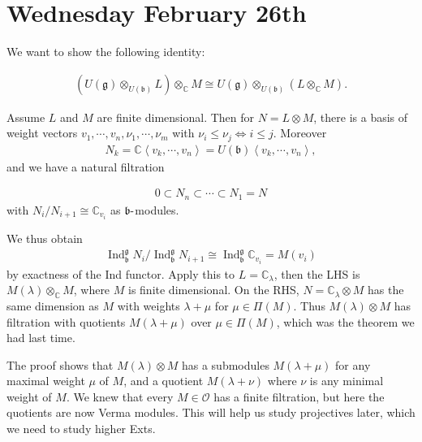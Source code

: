 \documentclass[11pt]{scrartcl}
\theoremstyle{definition}
\theoremstyle{theorem}
\theoremstyle{proof}
\theoremstyle{definition}
\theoremstyle{break}
\theoremstyle{problem}
\providecommand{\tightlist}{%
  \setlength{\itemsep}{0pt}\setlength{\parskip}{0pt}}
\DeclarePairedDelimiter\qty{(}{)}
\renewcommand{\qty}[1]{{\left(  {#1} \right)}}
\def\ind{\operatorname{Ind}}
\newcommand{\CC}[0]{{\mathbb{C}}}
\newcommand{\dash}[0]{{\hbox{-}}}
\newcommand{\generators}[1]{\left\langle{#1}\right\rangle}
\newcommand{\lieb}[0]{{\mathfrak{b}}}
\newcommand{\lieg}[0]{{\mathfrak{g}}}
\newcommand{\OO}[0]{{\mathcal{O}}}
\newcommand{\tensor}[0]{\otimes}
\begin{document}
\hypertarget{wednesday-february-26th}{%
\section{Wednesday February 26th}\label{wednesday-february-26th}}

We want to show the following identity:

\begin{align*}
\qty{ U(\lieg) \tensor_{U(\lieb)} L } \tensor_\CC M 
\cong
U(\lieg) \tensor_{U(\lieb)} \qty{ L \tensor_\CC M  }
.\end{align*}

Assume \(L\) and \(M\) are finite dimensional. Then for
\(N = L \tensor M\), there is a basis of weight vectors
\(v_1, \cdots, v_n, \nu_1, \cdots, \nu_m\) with
\(\nu_i \leq \nu_j \iff i\leq j\). Moreover
\begin{align*}N_k = \CC \generators{v_k, \cdots, v_n} = U(\lieb)\generators{v_k, \cdots, v_n},\end{align*}
and we have a natural filtration

\begin{align*}
0 \subset N_n \subset \cdots \subset N_1 = N
\end{align*} with \(N_i / N_{i+1} \cong \CC_{v_i}\) as
\(\lieb\dash\)modules.

We thus obtain
\begin{align*}\ind_\lieb^\lieg N_i / \ind_\lieb^\lieg N_{i+1} \cong \ind_\lieb^\lieg \CC_{v_i} = M(v_i)\end{align*}
by exactness of the Ind functor. Apply this to \(L = \CC_\lambda\), then
the LHS is \(M(\lambda) \tensor_\CC M\), where \(M\) is finite
dimensional. On the RHS, \(N = \CC_\lambda \tensor M\) has the same
dimension as \(M\) with weights \(\lambda + \mu\) for
\(\mu \in \Pi(M)\). Thus \(M(\lambda) \tensor M\) has filtration with
quotients \(M(\lambda + \mu)\) over \(\mu \in \Pi(M)\), which was the
theorem we had last time.

\begin{description}
\tightlist
\item[Remark]
The proof shows that \(M(\lambda) \tensor M\) has a submodules
\(M(\lambda + \mu)\) for any maximal weight \(\mu\) of \(M\), and a
quotient \(M(\lambda + \nu)\) where \(\nu\) is any minimal weight of
\(M\). We knew that every \(M\in \OO\) has a finite filtration, but here
the quotients are now Verma modules. This will help us study projectives
later, which we need to study higher Exts.
\end{description}
\end{document}
